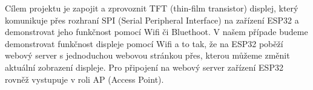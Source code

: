 Cílem projektu je zapojit a zprovoznit  TFT (thin-film transistor) displej, který komunikuje přes rozhraní SPI (Serial Peripheral Interface) na zařízení ESP32 a demonstrovat jeho funkčnost pomocí Wifi či Bluethoot. V našem případe budeme demonstrovat funkčnost displeje pomocí Wifi a to tak, že na ESP32 poběží webový server s jednoduchou webovou stránkou přes, kterou můžeme změnit aktuální zobrazení displeje. Pro připojení na webový server zařízení ESP32 rovněž vystupuje v roli AP (Access Point).





%



